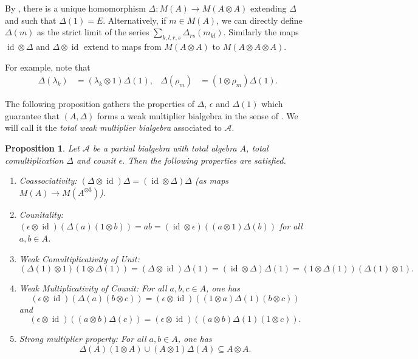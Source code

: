 \documentclass[11pt]{article}
\DeclareMathOperator{\id}{id}
\newtheorem{Prop}[Theorem]{Proposition}
\theoremstyle{definition}
\numberwithin{equation}{section}
\begin{document}
By \cite[Proposition A.3]{VDW2}, there is a unique homomorphism $\Delta:M(A)\rightarrow M(A\otimes A)$ extending $\Delta$ and such that $\Delta(1) = E$. Alternatively, if $m\in M(A)$, we can directly define $\Delta(m)$ as the strict limit of the series $\sum_{k,l,r,s} \Delta_{rs}(m_{kl})$. Similarly the maps $\id\otimes \Delta$ and $\Delta\otimes \id$ extend to maps from $M(A\otimes A)$ to $M(A\otimes A\otimes A)$. 

For example, note that
\begin{align} \label{eq:delta-lambda-rho} \Delta(\lambda_{k}) &=
  (\lambda_{k} \otimes 1)\Delta(1), & \Delta(\rho_{m}) &= (1 \otimes \rho_{m})\Delta(1).
\end{align}

The following proposition gathers the properties of $\Delta$, $\epsilon$ and $\Delta(1)$ which guarantee that $(A,\Delta)$ forms a weak multiplier bialgebra in the sense of \cite[Definition 2.1]{Boh1}. We will call it the \emph{total weak multiplier bialgebra} associated to $\mathscr{A}$.

\begin{Prop} Let $\mathscr{A}$ be a partial bialgebra with total algebra $A$, total comultiplication $\Delta$ and counit $\epsilon$. Then the following properties are satisfied.
\begin{enumerate}[label={(\arabic*)}]
\item Coassociativity: $(\Delta\otimes \id)\Delta = (\id\otimes \Delta)\Delta$ (as maps $M(A)\rightarrow M(A^{\otimes 3})$).
\item Counitality: $(\epsilon\otimes \id)(\Delta(a)(1\otimes b)) = ab = (\id\otimes \epsilon)((a\otimes 1)\Delta(b))$ for all $a,b\in A$.
\item Weak Comultiplicativity of Unit: \[(\Delta(1)\otimes 1)(1\otimes \Delta(1)) = (\Delta\otimes \id)\Delta(1) = (\id\otimes \Delta)\Delta(1) = (1\otimes \Delta(1))(\Delta(1)\otimes 1).\]
\item \label{WMC} Weak Multiplicativity of Counit: For all $a,b,c\in A$, one has \[(\epsilon\otimes \id)(\Delta(a)(b\otimes c)) = (\epsilon\otimes \id)((1\otimes a)\Delta(1)(b\otimes c))\] and 
\[(\epsilon\otimes \id)((a\otimes b)\Delta(c)) = (\epsilon\otimes \id)((a\otimes b)\Delta(1)(1\otimes c)).\]
\item Strong multiplier property: For all $a,b\in A$, one has \[\Delta(A)(1\otimes A)\cup (A\otimes 1)\Delta(A)\subseteq  A\otimes A.\] 
\end{enumerate}
\end{Prop}
\end{document}
